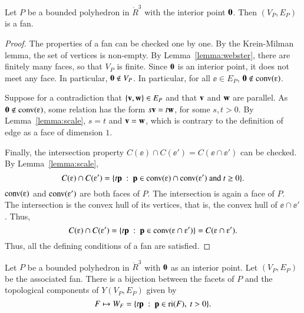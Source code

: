 \begin{lemma}\label{lemma:polyhedron}%
Let $P$ be a bounded polyhedron in $\ring{R}^3$ with the interior
point ${\mathbf 0}$.  Then $(V_P,E_P)$ is a fan.
\end{lemma}
%

\begin{proof} The properties of a fan can be checked one by one.  By
the Krein-Milman lemma, the set of vertices is non-empty.  By
Lemma~\ref{lemma:webster}, there are finitely many faces, so that
$V_P$ is finite.  Since ${\mathbf 0}$ is an interior point, it does not
meet any face.  In particular, ${\mathbf 0}\not\in V_P$.  In particular,
for all $\ee\in E_P$, $\orz\not\in \op{conv}(\ee)$.

Suppose for a contradiction that $\{{\mathbf v},{\mathbf w}\}\in E_P$ and that ${\mathbf v}$
and ${\mathbf w}$ are parallel.  As $\orz\not\in \op{conv}(\ee)$, some
relation has the form $s {\mathbf v} = t {\mathbf w}$, for some $s, t>0$.  By
Lemma~\ref{lemma:scale}, $s=t$ and ${\mathbf v}={\mathbf w}$, which is contrary to the
definition of edge as a face of dimension $1$.

Finally, the intersection property $C(\ee)\cap C(\ee') = C(\ee \cap
\ee')$ can be checked.  By Lemma~\ref{lemma:scale},
\begin{displaymath}
C(\ee) \cap C(\ee') = \{t \p \mid \p\in \op{conv}(\ee) \cap \op{conv}(\ee') \text{ and } t \ge 0\}.
\end{displaymath}
$\op{conv}(\ee)$ and $\op{conv}(\ee')$ are both faces of $P$.  The
intersection is again a face of $P$.  The intersection is the convex
hull of its vertices, that is, the convex hull of $\ee \cap \ee'$.
Thus,
\begin{displaymath}
C(\ee)\cap C(\ee') = \{t \p \mid \p\in \op{conv}(\ee\cap \ee')\} = C(\ee \cap \ee').
\end{displaymath}
Thus, all the defining conditions of a fan are satisfied.
\end{proof}


\begin{lemma}\label{lemma:WF} 
Let $P$ be a bounded polyhedron in $\ring{R}^3$ with ${\mathbf 0}$ as an
interior point.  Let $(V_P,E_P)$ be the associated fan.  There is a
bijection between the facets of $P$ and the topological components
of $Y(V_P,E_P)$ given by
\begin{displaymath}
F \mapsto W_F = \{t {\mathbf p} \ :\  {\mathbf p}\in {\operatorname{ri}}(F),~t >0\}.
\end{displaymath}
\end{lemma}
%

